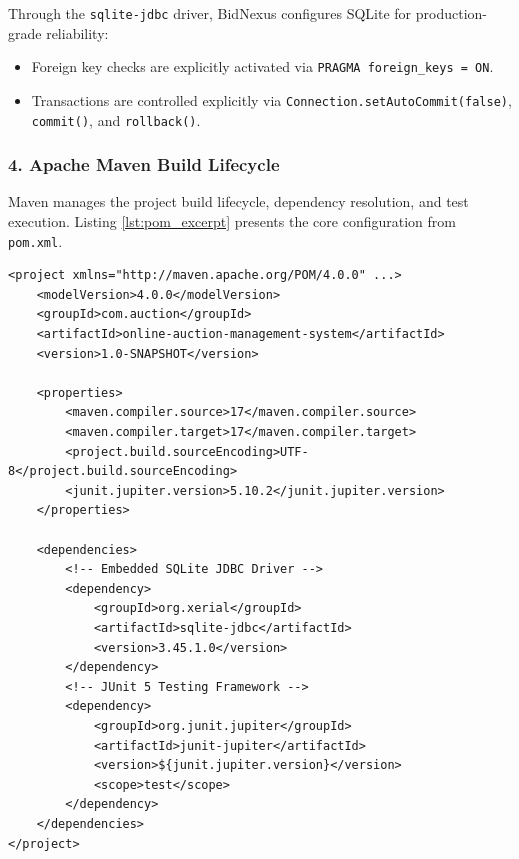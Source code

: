 Through the \texttt{sqlite-jdbc} driver, BidNexus configures SQLite for production-grade reliability:
\begin{itemize}[noitemsep]
    \item Foreign key checks are explicitly activated via \texttt{PRAGMA foreign\_keys = ON}.
    \item Transactions are controlled explicitly via \texttt{Connection.setAutoCommit(false)}, \texttt{commit()}, and \texttt{rollback()}.
\end{itemize}

\subsubsection{4. Apache Maven Build Lifecycle}
Maven manages the project build lifecycle, dependency resolution, and test execution. Listing \ref{lst:pom_excerpt} presents the core configuration from \texttt{pom.xml}.

\begin{lstlisting}[caption={Maven Build Configuration (\texttt{pom.xml})}, label={lst:pom_excerpt}]
<project xmlns="http://maven.apache.org/POM/4.0.0" ...>
    <modelVersion>4.0.0</modelVersion>
    <groupId>com.auction</groupId>
    <artifactId>online-auction-management-system</artifactId>
    <version>1.0-SNAPSHOT</version>

    <properties>
        <maven.compiler.source>17</maven.compiler.source>
        <maven.compiler.target>17</maven.compiler.target>
        <project.build.sourceEncoding>UTF-8</project.build.sourceEncoding>
        <junit.jupiter.version>5.10.2</junit.jupiter.version>
    </properties>

    <dependencies>
        <!-- Embedded SQLite JDBC Driver -->
        <dependency>
            <groupId>org.xerial</groupId>
            <artifactId>sqlite-jdbc</artifactId>
            <version>3.45.1.0</version>
        </dependency>
        <!-- JUnit 5 Testing Framework -->
        <dependency>
            <groupId>org.junit.jupiter</groupId>
            <artifactId>junit-jupiter</artifactId>
            <version>${junit.jupiter.version}</version>
            <scope>test</scope>
        </dependency>
    </dependencies>
</project>
\end{lstlisting}
